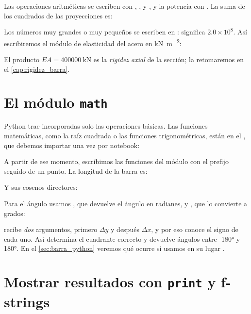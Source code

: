 Las operaciones aritméticas se escriben con \py{+}, \py{-}, \py{*} y \py{/}, y
la potencia con \py{**}. La suma de los cuadrados de las proyecciones es:

Los números muy grandes o muy pequeños se escriben en
:  significa
$2.0\times10^{8}$. Así escribiremos el módulo de elasticidad del acero en
\si{\kilo\newton\per\metre\squared}:

El producto $EA = \SI{400000}{\kilo\newton}$ es la \emph{rigidez axial} de la
sección; la retomaremos en el \cref{cap:rigidez_barra}.

\section{El módulo \texttt{math}}\label{sec:math}

Python trae incorporadas solo las operaciones básicas. Las funciones
matemáticas, como la raíz cuadrada o las funciones trigonométricas, están en
el  , que debemos importar una vez por
notebook:

A partir de ese momento, escribimos las funciones del módulo con el prefijo
 seguido de un punto. La longitud de la barra es:

Y sus cosenos directores:

Para el ángulo usamos , que devuelve el ángulo en
radianes, y , que lo convierte a grados:

\begin{python}
 recibe \emph{dos} argumentos, primero $\Delta y$ y después
$\Delta x$, y por eso conoce el signo de cada uno. Así determina el cuadrante
correcto y devuelve ángulos entre \ang{-180} y \ang{180}. En el
\cref{sec:barra_python} veremos qué ocurre si usamos en su lugar
.
\end{python}

\section{Mostrar resultados con \texttt{print} y f-strings}\label{sec:fstrings}

